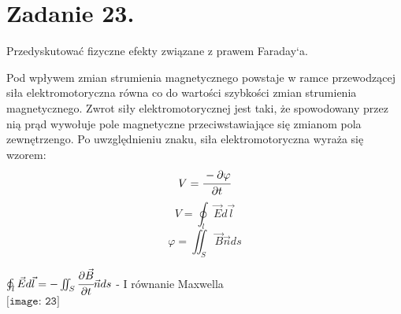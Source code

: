 \section*{Zadanie 23.}
\begin{task}
Przedyskutować fizyczne efekty związane z prawem Faraday`a.
\end{task}

\begin{solution}
Pod wpływem zmian strumienia magnetycznego powstaje w ramce przewodzącej siła elektromotoryczna równa co do wartości szybkości zmian strumienia magnetycznego. Zwrot siły elektromotorycznej jest taki, że spowodowany przez nią prąd wywołuje pole magnetyczne przeciwstawiające się zmianom pola zewnętrzengo.
Po uwzględnieniu znaku, siła elektromotoryczna wyraża się wzorem:
$$ V = \cfrac{-\partial\varphi}{\partial t}$$
$$ V = \oint_{l}\vec{E}d\vec{l} $$
$$ \varphi = \iint_{S}\vec{B}\vec{n}ds$$
\begin{center}
$\oint_{l}\vec{E}d\vec{l}=-\iint_{S}\cfrac{\partial\vec{B}}{\partial t}\vec{n}ds $ - I równanie Maxwella\\

    $\texttt{[image: 23]}$\\
    \end{center}
\end{solution}
